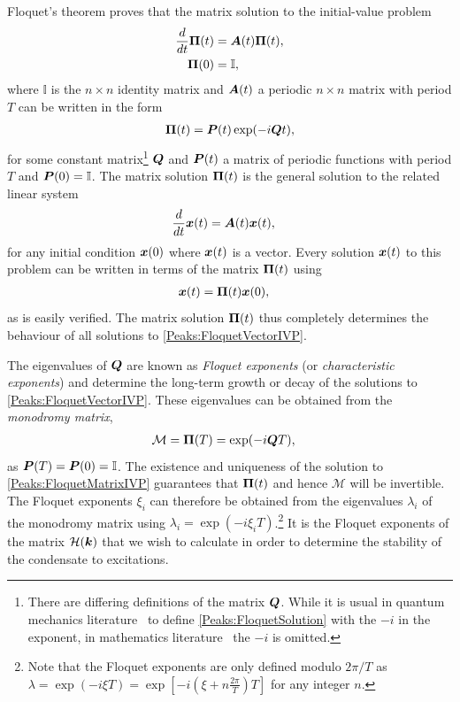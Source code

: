 Floquet's theorem proves that the matrix solution to the initial-value problem
\begin{subequations}
    \label{Peaks:FloquetMatrixIVP}
    \begin{align}
        \frac{d}{dt}\vect{\Pi}(t) &= \vect{A}(t) \vect{\Pi}(t),\\
        \vect{\Pi}(0) &= \mathbb{I},
    \end{align}
\end{subequations}
where $\mathbb{I}$ is the $n \times n$ identity matrix and $\bm{A}(t)$ a periodic $n \times n$ matrix with period $T$ can be written in the form
\begin{align}
    \vect{\Pi}(t) = \vect{P}(t) \exp(-i\vect{Q} t),
    \label{Peaks:FloquetSolution}
\end{align}
for some constant matrix\footnote{There are differing definitions of the matrix $\bm{Q}$. While it is usual in quantum mechanics literature~\citep{Shirley:1965,Hanggi:1998,Garrison:1999} to define \eqref{Peaks:FloquetSolution} with the $-i$ in the exponent,  in mathematics literature~\citep{Moulton:1958,AppliedNonlinearDynamics} the $-i$ is omitted.} $\bm{Q}$ and $\bm{P}(t)$ a matrix of periodic functions with period $T$ and $\bm{P}(0) = \mathbb{I}$. The matrix solution $\bm{\Pi}(t)$ is the general solution to the related linear system
\begin{align}
    \frac{d}{dt}\vect{x}(t) &= \vect{A}(t) \vect{x}(t),
    \label{Peaks:FloquetVectorIVP}
\end{align}
for any initial condition $\bm{x}(0)$ where $\bm{x}(t)$ is a vector. Every solution $\bm{x}(t)$ to this problem can be written in terms of the matrix $\bm{\Pi}(t)$ using
\begin{align}
    \bm{x}(t) &= \bm{\Pi}(t) \bm{x}(0),
\end{align}
as is easily verified. The matrix solution $\bm{\Pi}(t)$ thus completely determines the behaviour of all solutions to \eqref{Peaks:FloquetVectorIVP}.

The eigenvalues of $\bm{Q}$ are known as \emph{Floquet exponents} (or \emph{characteristic exponents}) and determine the long-term growth or decay of the solutions to \eqref{Peaks:FloquetVectorIVP}. These eigenvalues can be obtained from the \emph{monodromy matrix},
\begin{align}
    \label{Peaks:MonodromyMatrix}
    \mathcal{M} &= \vect{\Pi}(T) = \exp(-i\vect{Q} T),
\end{align}
as $\bm{P}(T) = \bm{P}(0) = \mathbb{I}$. The existence and uniqueness of the solution to \eqref{Peaks:FloquetMatrixIVP} guarantees that $\bm{\Pi}(t)$ and hence $\mathcal{M}$ will be invertible. The Floquet exponents $\xi_i$ can therefore be obtained from the eigenvalues $\lambda_i$ of the monodromy matrix using $\lambda_i = \exp(-i\xi_i T)$.\footnote{Note that the Floquet exponents are only defined modulo $2 \pi/T$ as $\displaystyle\lambda = \exp(-i\xi T) = \exp\left[-i \left(\xi + n \frac{2 \pi}{T}\right)T\right]$ for any integer $n$.} It is the Floquet exponents of the matrix $\mathcal{H}(\bm{k})$ that we wish to calculate in order to determine the stability of the condensate to excitations.

